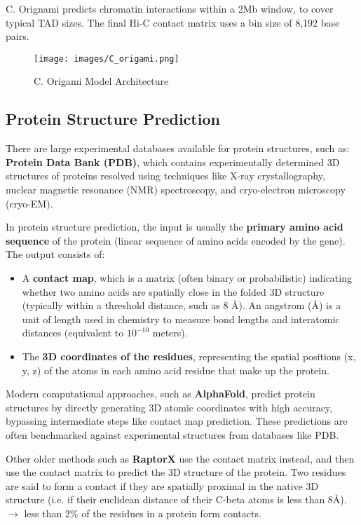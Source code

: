 \documentclass[a4paper]{article}
\begin{document}
C. Orignami predicts chromatin interactions within a 2Mb window, to cover
typical TAD sizes. The final Hi-C contact matrix uses a bin size of 8,192 base pairs.

\begin{figure}
  \centering
  \texttt{[image: images/C\_origami.png]}
  \caption{C. Origami Model Architecture}
\end{figure}

\subsection*{Protein Structure Prediction}

There are large experimental databases available for protein structures, 
such as:  
\textbf{Protein Data Bank (PDB)}, which contains experimentally determined 
3D structures of proteins resolved using techniques like X-ray 
crystallography, nuclear magnetic resonance (NMR) spectroscopy, 
and cryo-electron microscopy (cryo-EM).  

In protein structure prediction, the input is usually the 
\textbf{primary amino acid sequence} of the protein (linear sequence of 
amino acids encoded by the gene). The output consists of:  
\begin{itemize}
  \item A \textbf{contact map}, which is a matrix (often binary or 
  probabilistic) indicating whether two amino acids are spatially close 
  in the folded 3D structure (typically within a threshold distance, 
  such as 8 Å). An angstrom (Å) is a unit of length used in chemistry
  to measure bond lengths and interatomic distances (equivalent to $10^{-10}$ meters).
  \item The \textbf{3D coordinates of the residues}, representing the 
  spatial positions (x, y, z) of the atoms in each amino acid residue 
  that make up the protein.  
\end{itemize}

Modern computational approaches, such as \textbf{AlphaFold}, predict 
protein structures by directly generating 3D atomic coordinates with 
high accuracy, bypassing intermediate steps like contact map prediction. 
These predictions are often benchmarked against experimental structures 
from databases like PDB.

Other older methods such as \textbf{RaptorX} use the contact matrix instead,
and then use the contact matrix to predict the 3D structure of the protein.
Two residues are said to form a contact if they are spatially proximal in 
the native 3D structure (i.e. if their euclidean distance of their C-beta
atoms is less than 8Å). $\rightarrow$ less than 2\% of the residues in a protein
form contacts.
\end{document}
